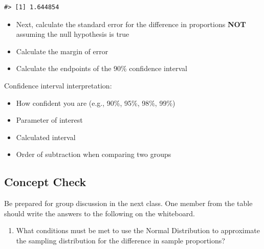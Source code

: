 \documentclass[
]{report}
\providecommand{\tightlist}{%
  \setlength{\itemsep}{0pt}\setlength{\parskip}{0pt}}
\begin{document}
\begin{verbatim}
#> [1] 1.644854
\end{verbatim}

\begin{itemize}
\tightlist
\item
  Next, calculate the standard error for the difference in proportions \textbf{NOT} assuming the null hypothesis is true
\end{itemize}

\vspace{0.8in}

\begin{itemize}
\tightlist
\item
  Calculate the margin of error
\end{itemize}

\vspace{0.6in}

\begin{itemize}
\tightlist
\item
  Calculate the endpoints of the 90\% confidence interval
\end{itemize}

\vspace{0.6in}

Confidence interval interpretation:

\begin{itemize}
\item
  How confident you are (e.g., 90\%, 95\%, 98\%, 99\%)
\item
  Parameter of interest
\item
  Calculated interval
\item
  Order of subtraction when comparing two groups
\end{itemize}

\vspace{0.8in}

\subsection{Concept Check}\label{concept-check-7}

Be prepared for group discussion in the next class. One member from the table should write the answers to the following on the whiteboard.

\begin{enumerate}
\def\labelenumi{\arabic{enumi}.}
\tightlist
\item
  What conditions must be met to use the Normal Distribution to approximate the sampling distribution for the difference in sample proportions?
\end{enumerate}
\end{document}

